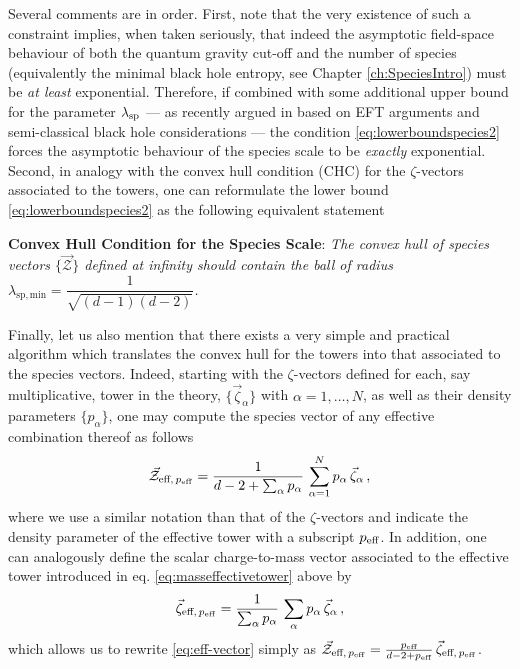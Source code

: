 Several comments are in order. First, note that the very existence of such a constraint implies, when taken seriously, that indeed the asymptotic field-space behaviour of both the quantum gravity cut-off and the number of species (equivalently the minimal black hole entropy, see Chapter \ref{ch:SpeciesIntro}) must be \emph{at least} exponential. Therefore, if combined with some additional upper bound for the parameter $\lambda_{\rm sp}$ --- as recently argued in \cite{vandeHeisteeg:2023ubh} based on EFT arguments and semi-classical black hole considerations --- the condition \eqref{eq:lowerboundspecies2} forces the asymptotic behaviour of the species scale to be \emph{exactly} exponential. Second, in analogy with the convex hull condition (CHC) for the $\zeta$-vectors associated to the towers, one can reformulate the lower bound \eqref{eq:lowerboundspecies2} as the following equivalent statement

\begin{center}
	\textbf{Convex Hull Condition for the Species Scale}: \textit{The convex hull of species vectors $\{ \vec{\mathcal{Z}}\}$ defined at infinity should contain the ball of radius $\lambda_{\text{sp}, \, \text{min}}= \dfrac{1}{\sqrt{(d-1)(d-2)}}$.} 
\end{center}

Finally, let us also mention that there exists a very simple and practical algorithm which translates the convex hull for the towers into that associated to the species vectors. Indeed, starting with the $\zeta$-vectors defined for each, say multiplicative, tower in the theory, $\{\vec{\zeta}_{\alpha}\}$ with $\alpha=1, \ldots, N$, as well as their density parameters $\{p_{\alpha}\}$, one may compute the species vector of any effective combination thereof as follows
%
\begin{equation} \label{eq:eff-vector}
    \vec{\mathcal{Z}}_{\text{eff},\, p_{\rm eff}} = \frac{1}{d-2+ \sum_\alpha p_{\alpha}} \, \sum_{\alpha=1}^{N} p_{\alpha} \, \vec{\zeta}_{\alpha}\, ,
\end{equation}
%
where we use a similar notation than that of the $\zeta$-vectors and indicate the density parameter of the effective tower with a subscript $p_{\rm eff}$. In addition, one can analogously define the scalar charge-to-mass vector associated to the effective tower introduced in eq. \eqref{eq:masseffectivetower} above by 
%
\begin{equation}
    \vec{\zeta}_{\text{eff},\, p_{\rm eff}} = \frac{1}{\sum_\alpha p_{\alpha}} \, \sum_{\alpha} p_{\alpha} \, \vec{\zeta}_{\alpha}\, ,
\end{equation}
%
which allows us to rewrite \eqref{eq:eff-vector} simply as $\vec{\mathcal{Z}}_{\text{eff},\, p_{\rm eff}}= \frac{p_{\text{eff}}}{d-2+p_{\text{eff}}}\, \vec{\zeta}_{\text{eff},\, p_{\rm eff}}$.


